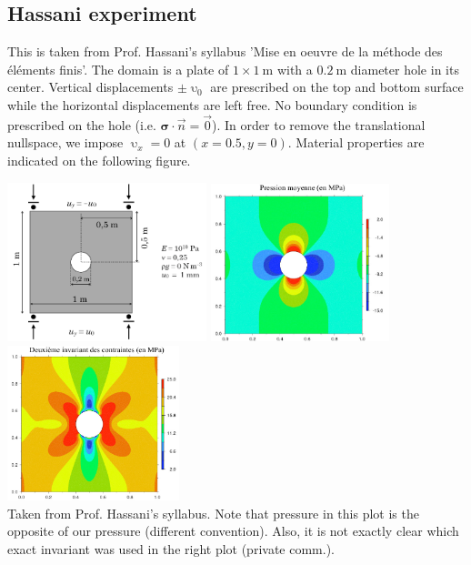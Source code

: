 \subsection*{Hassani experiment}

This is taken from Prof. Hassani's syllabus 'Mise en oeuvre de la m\'ethode des \'el\'ements finis'.
The domain is a plate of $1\times 1~\si{\meter}$ with a $0.2~\si{\meter}$ diameter hole in its center.
Vertical displacements $\pm \upupsilon_0$ are prescribed on the top and bottom surface while 
the horizontal displacements are left free. No boundary condition is prescribed on the hole (i.e.
${\bm \sigma}\cdot \vec{n}=\vec{0}$).
In order to remove the translational nullspace, we impose $\upupsilon_x=0$
at $(x=0.5,y=0)$. Material properties are indicated on the following figure.

\begin{center}
\includegraphics[width=5.8cm]{python_codes/fieldstone_124/images/hassani1}
\includegraphics[width=5.2cm]{python_codes/fieldstone_124/images/hassani2}
\includegraphics[width=5cm]{python_codes/fieldstone_124/images/hassani3}\\
{\captionfont Taken from Prof. Hassani's syllabus. Note that pressure in this plot is the opposite 
of our pressure (different convention). Also, it is not exactly clear 
which exact invariant was used in the right plot (private comm.).}
\end{center}

